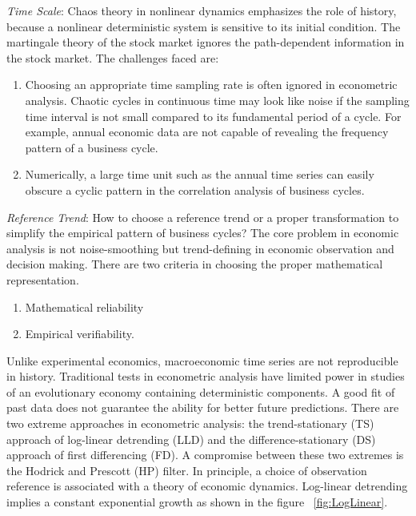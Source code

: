 \textit{Time Scale}:
Chaos theory in nonlinear dynamics emphasizes the role of history, because a nonlinear deterministic system is sensitive to its initial condition. The martingale theory of the stock market ignores the path-dependent information in the stock market. The challenges faced are:
\begin{enumerate}
\item Choosing an appropriate time sampling rate is often ignored in econometric analysis. Chaotic cycles in continuous time may look like noise if the sampling time interval is not small compared to its fundamental period of a cycle.  For example, annual economic data are not capable of revealing the frequency pattern of a business cycle. 
\item Numerically, a large time unit such as the annual time series can easily obscure a cyclic pattern in the correlation analysis of business cycles.
\end{enumerate}
\textit{Reference Trend}:
How to choose a reference trend or a proper transformation to simplify the empirical pattern of business cycles? The core problem in economic analysis is not noise-smoothing but trend-defining in economic observation and decision making. There are two criteria in choosing the proper mathematical representation. 
\begin{enumerate}
\item Mathematical reliability 
\item Empirical verifiability.
\end{enumerate}
Unlike experimental economics, macroeconomic time series are not reproducible in history. Traditional tests in econometric analysis have limited power in studies of an evolutionary economy containing deterministic components.  A good fit of past data does not guarantee the ability for better future predictions.  There are two extreme approaches in econometric analysis: the trend-stationary (TS) approach of log-linear detrending (LLD) and the difference-stationary (DS) approach of first differencing (FD).  A compromise between these two extremes is the Hodrick and Prescott (HP) filter.  In principle, a choice of observation reference is associated with a theory of economic dynamics. Log-linear detrending implies a constant exponential growth as shown in the figure ~\ref{fig:LogLinear}. 

